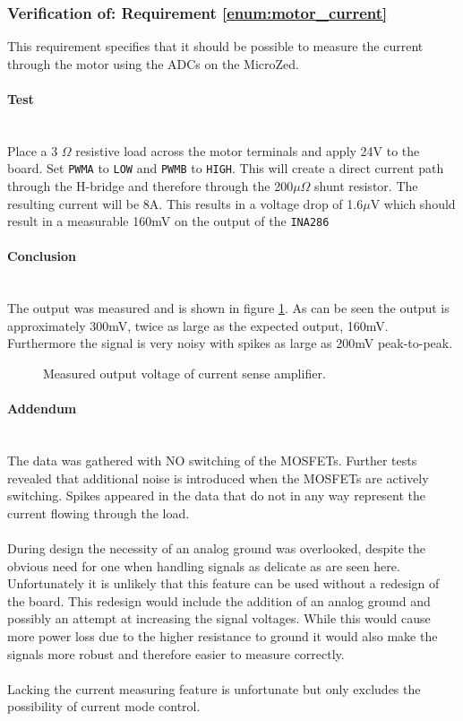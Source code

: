 \subsubsection{Verification of: Requirement \ref{enum:motor_current}} %
\label{ssub:requrement_enum:motor_current_}
This requirement specifies that it should be possible to measure the current through the motor using the ADCs on the MicroZed.

\paragraph{Test}~\\
Place a 3 $\Omega$ resistive load across the motor terminals and apply 24V to the board.
Set \texttt{PWMA} to \texttt{LOW} and \texttt{PWMB} to \texttt{HIGH}.
This will create a direct current path through the H-bridge and therefore through the 200$\mu\Omega$ shunt resistor.
The resulting current will be 8A.
This results in a voltage drop of 1.6$\mu$V which should result in a measurable 160mV on the output of the \texttt{INA286}

\paragraph{Conclusion}~\\
The output was measured and is shown in figure \ref{fig:controllerboardv2_current_sense}.
As can be seen the output is approximately 300mV, twice as large as the expected output, 160mV.
Furthermore the signal is very noisy with spikes as large as 200mV peak-to-peak. 

\begin{figure}[h]
\centering

\caption{Measured output voltage of current sense amplifier.}
\label{fig:controllerboardv2_current_sense}
\end{figure}

\paragraph{Addendum}~\\
The data was gathered with NO switching of the MOSFETs.
Further tests revealed that additional noise is introduced when the MOSFETs are actively switching.
Spikes appeared in the data that do not in any way represent the current flowing through the load.
\\~\\
During design the necessity of an analog ground was overlooked, despite the obvious need for one when handling signals as delicate as are seen here.
Unfortunately it is unlikely that this feature can be used without a redesign of the board.
This redesign would include the addition of an analog ground and possibly an attempt at increasing the signal voltages.
While this would cause more power loss due to the higher resistance to ground it would also make the signals more robust and therefore easier to measure correctly.
\\~\\
Lacking the current measuring feature is unfortunate but only excludes the possibility of current mode control.

